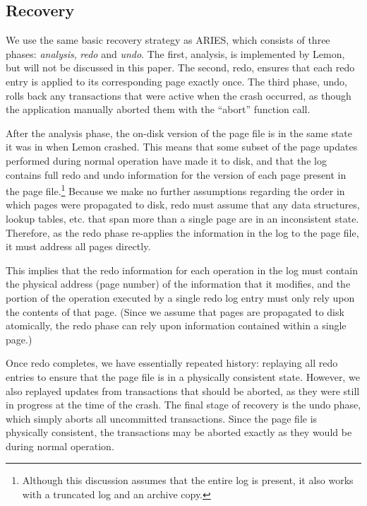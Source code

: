 \documentclass[letterpaper,twocolumn,english]{article}
\newcommand{\yad}{Lemon\xspace}
\begin{document}
\subsection{Recovery}
\label{recovery}

%

We use the same basic recovery strategy as ARIES, which consists of
three phases: {\em analysis}, {\em redo} and {\em undo}.  The first,
analysis, is implemented by \yad, but will not be discussed in this
paper. The second, redo, ensures that each redo entry is applied to
its corresponding page exactly once.  The third phase, undo, rolls
back any transactions that were active when the crash occurred, as
though the application manually aborted them with the ``abort''
function call.
  
After the analysis phase, the on-disk version of the page file is in
the same state it was in when \yad crashed. This means that some
subset of the page updates performed during normal operation have made
it to disk, and that the log contains full redo and undo information
for the version of each page present in the page
file.\footnote{Although this discussion assumes that the entire log is
present, it also works with a truncated log and an archive copy.}
Because we make no further assumptions regarding the order in which
pages were propagated to disk, redo must assume that any data
structures, lookup tables, etc. that span more than a single page are
in an inconsistent state. Therefore, as the redo phase re-applies the
information in the log to the page file, it must address all pages
directly.

This implies that the redo information for each operation in the log
must contain the physical address (page number) of the information
that it modifies, and the portion of the operation executed by a
single redo log entry must only rely upon the contents of that
page. (Since we assume that pages are propagated to disk atomically,
the redo phase can rely upon information contained within a single
page.)

Once redo completes, we have essentially repeated history: replaying
all redo entries to ensure that the page file is in a physically
consistent state.  However, we also replayed updates from transactions
that should be aborted, as they were still in progress at the time of
the crash.  The final stage of recovery is the undo phase, which simply
aborts all uncommitted transactions. Since the page file is physically
consistent, the transactions may be aborted exactly as they would be
during normal operation.
\end{document}
